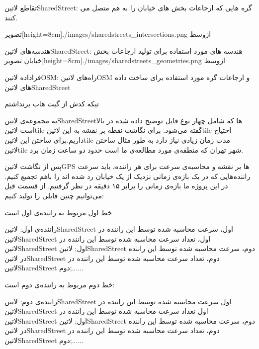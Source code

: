  تقاطع ‌لاتین{SharedStreet}: گره هایی که ارجاعات بخش های خیابان را به هم متصل می کنند.


  ‌تصویر[height=8cm]{./images/sharedstreets_intersections.png}
  ‌ازوسط


 هندسه‌های ‌لاتین{SharedStreet}: هندسه های مورد استفاده برای تولید ارجاعات بخش خیابان
  ‌تصویر[height=8cm]{./images/sharedstreets_geometries.png}
  ‌ازوسط


 فراداده ‌لاتین{OSM}: راه‌های  لاتین{OSM} و ارجاعات گره مورد استفاده برای ساخت داده های  لاتین{SharedStreet}


تیکه کدش از گیت هاب برنداشتم

به مجموعه‌ی  لاتین{SharedStreet}ها که شامل چهار نوع فایل توضیح داده شده در بالا است  لاتین{tile} گفته می‌شود. برای نگاشت نقطه بر نقشه به این  لاتین{tile} احتیاج داریم.برای ساختن این  لاتین{tile} مدت زمان زیادی نیاز دارد به طور مثال ساختن  لاتین{tile} شهر تهران که منطقه‌ی مورد مطالعه‌ی ما است حدود دو ساعت زمان برد.


پس از نگاشت  لاتین{GPS} ها بر نقشه و محاسبه‌ی سرعت برای هر راننده، باید سرعت راننده‌هایی که در یک بازه‌ی زمانی نزدیک از یک خیابان رد شده اند را باهم تجمیع کنیم. در این پروژه ما بازه‌ی زمانی را برابر ۱۵ دقیقه در نظر گرفتیم. از قسمت قبل می‌توانیم چنین فایلی را تولید کنیم:

خط اول مربوط به راننده‌ی اول است

راننده‌ی اول:  لاتین{SharedStreet} اول، سرعت محاسبه شده توسط این راننده در  لاتین{SharedStreet} اول، تعداد سرعت محاسبه شده توسط این راننده در  لاتین{SharedStreet} اول;   لاتین{SharedStreet} دوم، سرعت محاسبه شده توسط این راننده در  لاتین{SharedStreet} دوم، تعداد سرعت محاسبه شده توسط این راننده در  لاتین{SharedStreet} دوم;......


خط دوم مربوط به راننده‌ی دوم است:

راننده‌ی دوم:  لاتین{SharedStreet} اول سرعت محاسبه شده توسط این راننده در  لاتین{SharedStreet} اول تعداد سرعت محاسبه شده توسط این راننده در  لاتین{SharedStreet} اول;   لاتین{SharedStreet} دوم، سرعت محاسبه شده توسط این راننده در  لاتین{SharedStreet} دوم، تعداد سرعت محاسبه شده توسط این راننده در  لاتین{SharedStreet} دوم;......

